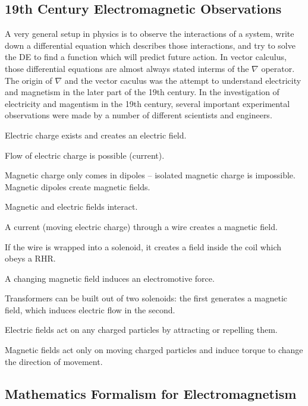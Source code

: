 \documentclass[fleqn,letterpaper]{report}
\begin{document}
\subsection{19th Century Electromagnetic Observations}
\label{electromagnetism-observations}

A very general setup in physics is to observe the interactions
of a system, write down a differential equation which
describes those interactions, and try to solve the DE to find
a function which will predict future action. In vector
calculus, those differential equations are almost always
stated interms of the $\nabla$ operator. The origin of
$\nabla$ and the vector caculus was
the attempt to understand electricity and
magnetism in the later part of the 19th century. In the
investigation of electricity and magentism in the 19th
century, several important experimental observations were made
by a number of different scientists and engineers.

\begin{smallitemize}
\item Electric charge exists and creates an electric field.
\item Flow of electric charge is possible (current).
\item Magnetic charge only comes in dipoles -- isolated
magnetic charge is impossible. Magnetic dipoles create
magnetic fields.
\item Magnetic and electric fields interact.
\item A current (moving electric charge) through a wire
creates a magnetic field.
\item If the wire is wrapped into a solenoid, it creates a
field inside the coil which obeys a RHR.
\item A changing magnetic field induces an electromotive force.
\item Transformers can be built out of two solenoids: the
first generates a magnetic field, which induces electric flow
in the second.
\item Electric fields act on any charged particles by 
attracting or repelling them. 
\item Magnetic fields act only on moving charged particles and induce
torque to change the direction of movement. 
\end{smallitemize}

\subsection{Mathematics Formalism for Electromagnetism}
\label{electromagnetism-formalism}
\end{document}
